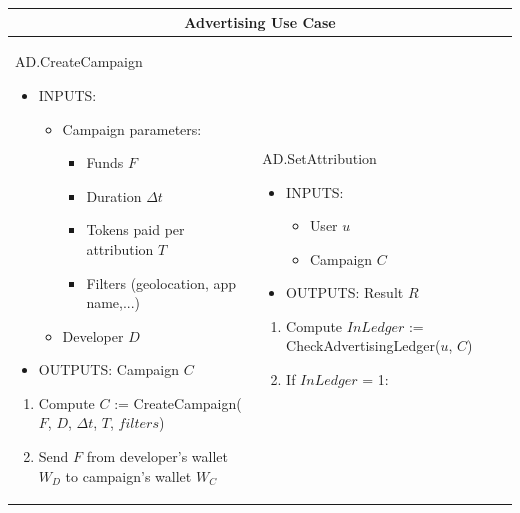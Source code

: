 \begin{table}[H]
\scriptsize
\centering
\begin{tabular}{|p{}p{}|}
\hline
\multicolumn{2}{|c|}{Advertising Use Case} \\
\hline \vspace{0.1cm}
\textsf{AD.CreateCampaign}
\begin{itemize}
	\vspace{-0.3cm}
	\item INPUTS:
	\vspace{-0.4cm}
	\begin{itemize}
		\item Campaign parameters:
		\begin{itemize}
			\item Funds $F$
			\item Duration $\Delta t$
			\item Tokens paid per attribution $T$
			\item Filters (geolocation, app name,...)
		\end{itemize}
		\item Developer $D$
	\end{itemize}
	\item OUTPUTS: Campaign $C$
\end{itemize}
\begin{enumerate}
	\item Compute $C$ := \textsf{CreateCampaign}($F$, $D$, $\Delta t$, $T$, $filters$)
	\item Send $F$ from developer's wallet $W_D$ to campaign's wallet $W_C$
\end{enumerate} & \vspace{0.1cm} \textsf{AD.SetAttribution}
\begin{itemize}
	\vspace{-0.3cm}
	\item INPUTS:
	\vspace{-0.4cm}
	\begin{itemize}
		\item User $u$
		\item Campaign $C$
	\end{itemize}
	\item OUTPUTS: Result $R$
\end{itemize}
\begin{enumerate}
	\item Compute $InLedger$ := \textsf{CheckAdvertisingLedger}($u$, $C$)
	\item If $InLedger$ = 1:
	\begin{itemize}

\end{itemize}
\end{enumerate}
\end{tabular}
\end{table}
